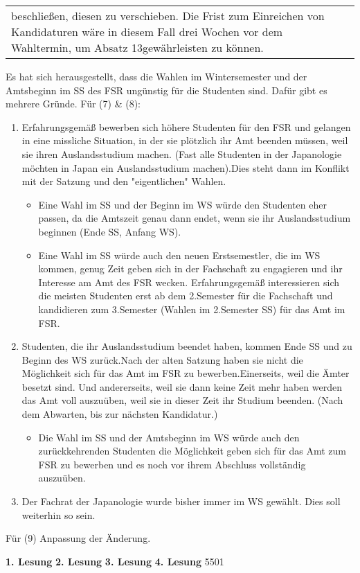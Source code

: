 {\begin{longtable}{|p{7.5cm}|p{7.5cm}|}
        beschließen, diesen zu verschieben. Die Frist zum Einreichen von Kandidaturen wäre in diesem Fall drei Wochen vor dem
        Wahltermin, um Absatz 13gewährleisten zu können.\\
    \end{longtable}
    }{
        Es hat sich herausgestellt, dass die Wahlen im Wintersemester und der Amtsbeginn im SS des FSR ungünstig für die Studenten
        sind. Dafür gibt es mehrere Gründe.\newline
        Für (7) \& (8):
        \begin{enumerate}
            \item Erfahrungsgemäß bewerben sich höhere Studenten für den FSR und gelangen in eine missliche Situation,
            in der sie plötzlich ihr Amt beenden müssen, weil sie ihren Auslandsstudium machen. (Fast alle Studenten in der
            Japanologie möchten in Japan ein Auslandsstudium machen).Dies steht dann im Konflikt mit der Satzung und den 
            "eigentlichen" Wahlen.
            \begin{itemize}
                \item Eine Wahl im SS und der Beginn im WS würde den Studenten eher passen, da die Amtszeit genau dann endet, wenn sie ihr Auslandsstudium beginnen (Ende SS, Anfang WS).
                \item Eine Wahl im SS würde auch den neuen Erstsemestler, die im WS kommen, genug Zeit geben sich in der Fachschaft zu engagieren und ihr Interesse am Amt des FSR wecken. Erfahrungsgemäß interessieren sich die meisten Studenten erst ab dem 2.Semester für die Fachschaft und kandidieren zum 3.Semester (Wahlen im 2.Semester SS) für das Amt im FSR.
            \end{itemize}
            \item Studenten, die ihr Auslandsstudium beendet haben, kommen Ende SS und zu Beginn des WS zurück.Nach der alten Satzung haben sie nicht die Möglichkeit sich für das Amt im FSR zu bewerben.Einerseits, weil die Ämter besetzt sind. Und andererseits, weil sie dann keine Zeit mehr haben werden das Amt voll auszuüben, weil sie in dieser Zeit ihr Studium beenden. (Nach dem Abwarten, bis zur nächsten Kandidatur.)
            \begin{itemize}
                \item Die Wahl im SS und der Amtsbeginn im WS würde auch den zurückkehrenden Studenten die Möglichkeit geben sich für das Amt zum FSR zu bewerben und es noch vor ihrem Abschluss vollständig auszuüben.
            \end{itemize}
            \item Der Fachrat der Japanologie wurde bisher immer im WS gewählt. Dies soll weiterhin so sein.
        \end{enumerate}
        Für (9) Anpassung der Änderung.
    }{
        \textbf{1. Lesung}
        \ul{}
        \textbf{2. Lesung}
        \ul{}
        \textbf{3. Lesung}
        \ul{}
        \textbf{4. Lesung}
        \ul{}
    }{55}{0}{1}

